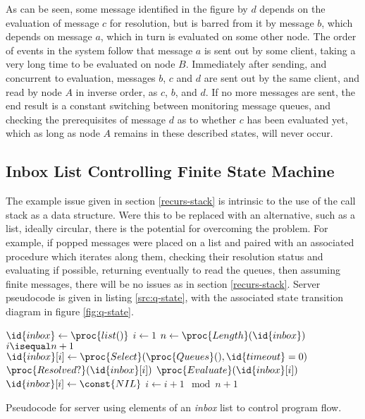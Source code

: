 As can be seen, some message identified in the figure by \(d\) depends on the
evaluation of message \(c\) for resolution, but is barred from it by message
\(b\), which depends on message \(a\), which in turn is evaluated on some other
node.
The order of events in the system follow that message \(a\) is sent out by some
client, taking a very long time to be evaluated on node \(B\).
Immediately after sending, and concurrent to evaluation, messages \(b\), \(c\)
and \(d\) are sent out by the same client, and read by node \(A\) in inverse
order, as \(c\), \(b\), and \(d\).
If no more messages are sent, the end result is a constant switching between
monitoring message queues, and checking the prerequisites of message \(d\) as
to whether \(c\) has been evaluated yet, which as long as node \(A\) remains in
these described states, will never occur.

\subsection{Inbox List Controlling Finite State Machine}
\label{inbox-list}

The example issue given in section \cref{recurs-stack} is intrinsic to the use
of the call stack as a data structure.
Were this to be replaced with an alternative, such as a list, ideally circular,
there is the potential for overcoming the problem.
For example, if popped messages were placed on a list and paired with an
associated procedure which iterates along them, checking their resolution
status and evaluating if possible, returning eventually to read the queues,
then assuming finite messages, there will be no issues as in section
\cref{recurs-stack}.
Server pseudocode is given in listing \cref{src:q-state}, with the associated
state transition diagram in figure \cref{fig:q-state}.

\begin{srcclrs}
\begin{codebox}
	\li \(\id{inbox} \gets \proc{list()}\)
	\li \(i \gets 1\)
	\li \Repeat
	\li \(n \gets \proc{Length}(\id{inbox})\)
	\li \If \(i \isequal n + 1\)
	\li \Then
	\(\id{inbox}[i] \gets \proc{Select}(\proc{Queues}(), \id{timeout}=0)\)
	\End
	\li \If \(\proc{Resolved?}(\id{inbox}[i])\)
	\li \Then
	\(\proc{Evaluate}(\id{inbox}[i])\)
	\li \(\id{inbox}[i] \gets \const{NIL}\)
	\End
	\li \(i \gets i + 1 \mod n + 1\)
	\End
\end{codebox}
	\caption{\label{src:q-state}Pseudocode for server using elements of an
	\textit{inbox} list to control program flow.}
\end{srcclrs}

